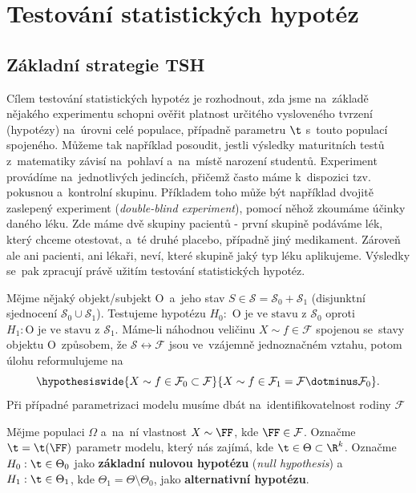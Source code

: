 \chapter{Testování statistických hypotéz}

\section{Základní strategie TSH}
Cílem testování statistických hypotéz je rozhodnout, zda jsme na~základě nějakého experimentu schopni ověřit platnost určitého vysloveného tvrzení (hypotézy) na~úrovni celé populace, případně parametru $\t$ s~touto populací spojeného. Můžeme tak například posoudit, jestli výsledky maturitních testů z~matematiky závisí na~pohlaví a~na~místě narození studentů.
Experiment provádíme na~jednotlivých jedincích,  přičemž často máme k~dispozici tzv. pokusnou a~kontrolní skupinu. Příkladem toho může být například dvojitě zaslepený experiment (\textit{double-blind experiment}), pomocí něhož zkoumáme účinky daného léku. Zde máme dvě skupiny pacientů - první skupině podáváme lék, který chceme otestovat, a~té druhé placebo, případně jiný medikament. Zároveň ale ani pacienti, ani lékaři, neví, které skupině jaký typ léku aplikujeme. Výsledky se~pak zpracují právě užitím testování statistických hypotéz.

Mějme nějaký objekt/subjekt O~a~jeho stav $S\in\mathscr{S}=\mathscr{S}_0+\mathscr{S}_1$ (disjunktní sjednocení $\mathscr{S}_0\cup\mathscr{S}_1$). Testujeme hypotézu
$H_0:\text{ O~je ve~stavu z~}\mathscr{S}_0$ oproti~$H_1:\text{O je ve~stavu z~}\mathscr{S}_1$. Máme-li náhodnou veličinu $X\sim f\in\mathcal{F}$ spojenou se~stavy objektu O~způsobem, že $\mathscr{S}\leftrightarrow\mathcal{F}$ jsou ve~vzájemně jednoznačném vztahu, potom úlohu reformulujeme na
	$$ \hypothesiswide{X\sim f\in\mathcal{F}_0\subset \mathcal{F}}{X\sim f\in \mathcal{F}_1=\mathcal{F}\dotminus\mathcal{F}_0}.$$
	Při případné parametrizaci modelu musíme dbát na~identifikovatelnost rodiny $\mathcal{F}$


\begin{define}
	Mějme populaci $\Omega$ a~na~ní vlastnost $X\sim\FF$, kde \mbox{$\FF\in\mathcal{F}$}. Označme $\t=\t(\FF)$ parametr modelu, který nás zajímá, kde $\t\in\Theta\subset\R^k$. Označme $H_0:\t\in\Theta_0$ jako \textbf{základní nulovou hypotézu} (\textit{null hypothesis}) a~ $H_1:\t\in\Theta_1$, kde \mbox{$\Theta_1=\Theta\setminus\Theta_0$}, jako \textbf{alternativní hypotézu}. 
\end{define}

